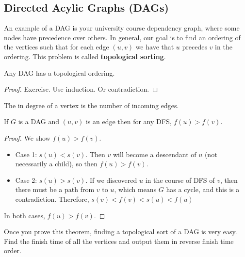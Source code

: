 \subsection{Directed Acylic Graphs (DAGs)}

An example of a DAG is your university course dependency graph, where
some nodes have precedence over others. In general, our goal is to
find an ordering of the vertices such that for each edge $(u, v)$
we have that $u$ precedes $v$ in the ordering. This problem is called
\textbf{topological sorting}.

\begin{lemma}
    Any DAG has a topological ordering.
\end{lemma}

\begin{proof}
    Exercise. Use induction. Or contradiction.
\end{proof}

\begin{definition}
    The in degree of a vertex is the number of incoming edges.
\end{definition}

\begin{theorem}
    If $G$ is a DAG and $(u, v)$ is an edge then for any DFS,
    $f(u) > f(v)$.
\end{theorem}

\begin{proof}

    We show $f(u) > f(v)$.
    \begin{itemize}
    \item Case 1: $s(u) < s(v)$. Then $v$ will become a descendant of
    $u$ (not necessarily a child), so then $f(u) > f(v)$.
    \item Case 2: $s(u) > s(v)$. If we discovered $u$ in the course
    of DFS of $v$, then there must be a path from $v$ to $u$, which
    means $G$ has a cycle, and this is a contradiction. Therefore, 
    $s(v) < f(v) < s(u) < f(u)$
\end{itemize}
In both cases, $f(u) > f(v)$.
\end{proof}

\begin{remark}
    Once you prove this theorem, finding a topological sort of a DAG is
very easy. Find the finish time of all the vertices and output them
in reverse finish time order.
\end{remark}














